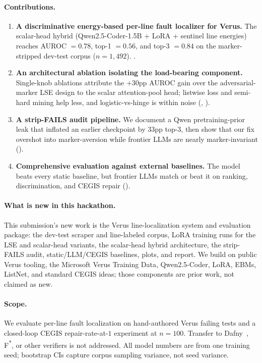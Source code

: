 \documentclass[10pt]{article}
\begin{document}
\paragraph{Contributions.}
\begin{enumerate}[leftmargin=*,itemsep=2pt,topsep=2pt]
\item \textbf{A discriminative energy-based per-line fault
  localizer for Verus.} The scalar-head hybrid (Qwen2.5-Coder-1.5B
  + LoRA + sentinel line energies) reaches AUROC $=0.78$, top-1
  $=0.56$, and top-3 $=0.84$ on the marker-stripped dev-test corpus
  ($n=1{,}492$). .
\item \textbf{An architectural ablation isolating the load-bearing
  component.} Single-knob ablations attribute the $+30$pp AUROC gain
  over the adversarial-marker LSE design to the scalar attention-pool
  head; listwise loss and semi-hard mining help less, and
  logistic-vs-hinge is within noise (,
  ).
\item \textbf{A strip-FAILS audit pipeline.} We document a Qwen
  pretraining-prior leak that inflated an earlier checkpoint by
  $33$pp top-3, then show that our fix overshot into marker-aversion
  while frontier LLMs are nearly marker-invariant
  ().
\item \textbf{Comprehensive evaluation against external baselines.}
  The model beats every static baseline, but frontier LLMs match or
  beat it on ranking, discrimination, and CEGIS repair
  ().
\end{enumerate}

\paragraph{What is new in this hackathon.}
This submission's new work is the Verus line-localization system and
evaluation package: the dev-test scraper and line-labeled corpus, LoRA
training runs for the LSE and scalar-head variants, the scalar-head
hybrid architecture, the strip-FAILS audit, static/LLM/CEGIS baselines,
plots, and report. We build on public Verus tooling, the Microsoft Verus
Training Data, Qwen2.5-Coder, LoRA, EBMs, ListNet, and standard CEGIS
ideas; those components are prior work, not claimed as new.

\paragraph{Scope.} We evaluate per-line fault localization on
hand-authored Verus failing tests and a closed-loop CEGIS
repair-rate-at-$1$ experiment at $n=100$. Transfer to Dafny~\cite{dafny},
F\textsuperscript{*}, or other verifiers is not addressed. All model
numbers are from one training seed; bootstrap CIs capture corpus
sampling variance, not seed variance.
\end{document}
